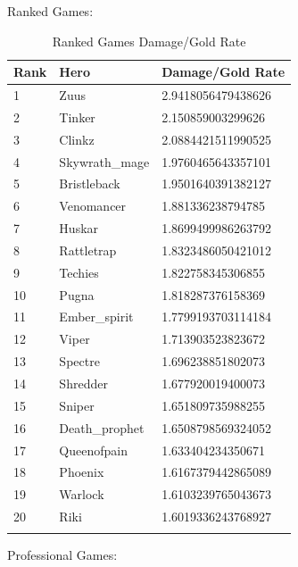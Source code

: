 \documentclass{article}
\begin{document}
Ranked Games:

\begin{longtable}{|p{2.5cm}|p{2.5cm}|p{5.5cm}|}

\hline
\textbf{Rank} & \textbf{Hero} & \textbf{Damage/Gold Rate} \\
\hline
\endhead

1 & Zuus & 2.9418056479438626 \\\hline
2 & Tinker & 2.150859003299626 \\\hline
3 & Clinkz & 2.0884421511990525 \\\hline
4 & Skywrath\_mage & 1.9760465643357101 \\\hline
5 & Bristleback & 1.9501640391382127 \\\hline
6 & Venomancer & 1.881336238794785 \\\hline
7 & Huskar & 1.8699499986263792 \\\hline
8 & Rattletrap & 1.8323486050421012 \\\hline
9 & Techies & 1.822758345306855 \\\hline
10 & Pugna & 1.818287376158369 \\\hline
11 & Ember\_spirit & 1.7799193703114184 \\\hline
12 & Viper & 1.713903523823672 \\\hline
13 & Spectre & 1.696238851802073 \\\hline
14 & Shredder & 1.677920019400073 \\\hline
15 & Sniper & 1.651809735988255 \\\hline
16 & Death\_prophet & 1.6508798569324052 \\\hline
17 & Queenofpain & 1.633404234350671 \\\hline
18 & Phoenix & 1.6167379442865089 \\\hline
19 & Warlock & 1.6103239765043673 \\\hline
20 & Riki & 1.6019336243768927 \\\hline

\caption{Ranked Games Damage/Gold Rate}
\label{ranked-games-damage-gold-rate}
\end{longtable}

Professional Games:
\end{document}
